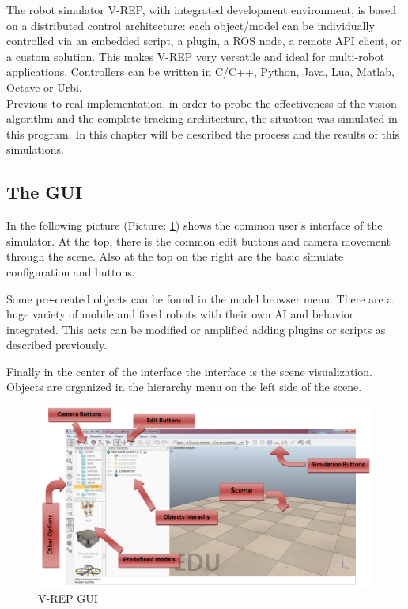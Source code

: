 The robot simulator V-REP, with integrated development environment, is based on a distributed control architecture: each object/model can be individually controlled via an embedded script, a plugin, a ROS node, a remote API client, or a custom solution. This makes V-REP very versatile and ideal for multi-robot applications. Controllers can be written in C/C++, Python, Java, Lua, Matlab, Octave or Urbi. \\

Previous to real implementation, in order to probe the effectiveness of the vision algorithm and the complete tracking architecture, the situation was simulated in this program. In this chapter will be described the process and the results of this simulations.

\subsection{The GUI}

In the following picture (Picture: \ref{fig:VREP_GUI}) shows the common user's interface of the simulator. At the top, there is the common edit buttons and camera movement through the scene. Also at the top on the right are the basic simulate configuration and buttons.

Some pre-created objects can be found in the model browser menu. There are a huge variety of mobile and fixed robots with their own AI and behavior integrated. This acts can be modified or amplified adding plugins or scripts as described previously.

Finally in the center of the interface the interface is the scene visualization. Objects are organized in the hierarchy menu on the left side of the scene.

\begin{figure}
	\includegraphics[width=\textwidth,natwidth=964,natheight=520]{../Images/c3/vrep_main.png}
	\caption{V-REP GUI}
	\label{fig:VREP_GUI}
\end{figure}


